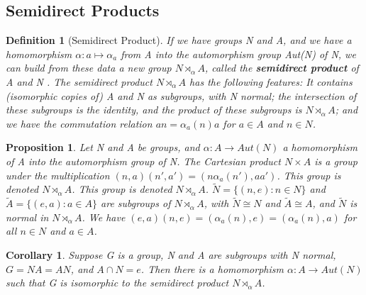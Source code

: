 \documentclass[12pt]{article}
\newtheorem{definition}{Definition}[subsection]
\newtheorem{proposition}{Proposition}[subsection]
\newtheorem{corollary}{Corollary}[subsection]
\begin{document}
    \subsection{Semidirect Products}
    \begin{definition}[Semidirect Product]
        If we have groups N and A, and we have a homomorphism $\alpha : a \mapsto \alpha_a$ from A into the automorphism group Aut(N) of N, we can build from these data a new group $N \rtimes_{\alpha} A$, called the \textbf{semidirect product} of A and N . The semidirect product $N \rtimes_{\alpha} A$ has the following features: It contains (isomorphic copies of) A and N as subgroups, with N normal; the intersection of these subgroups is the identity, and the product of these subgroups is $N \rtimes_{\alpha} A$; and we have the commutation relation $an = \alpha_a(n)a$ for $a \in A$ and $n \in N$.
    \end{definition}

    \begin{proposition}
        Let N and A be groups, and $\alpha: A \rightarrow Aut(N)$ a homomorphism of A into the automorphism group of N. The Cartesian product $N \times A$ is a group under the multiplication $(n, a)(n', a') = (n\alpha_a(n'), aa')$. This group is denoted $N \rtimes_{\alpha} A$. This group is denoted $N \rtimes_{\alpha} A$. $\tilde{N} = \{(n, e):n \in N\}$ and $\tilde{A} = \{(e, a): a \in A\}$ are subgroups of $N \rtimes_{\alpha} A$, with $\tilde{N} \cong N$ and $\tilde{A} \cong A$, and $\tilde{N}$ is normal in $N \rtimes_{\alpha} A$. We have $(e, a)(n, e) = (\alpha_a(n), e) = (\alpha_a(n), a)$ for all $n \in N$ and $a \in A$.
    \end{proposition}
    \begin{corollary}
        Suppose G is a group, N and A are subgroups with N normal, $G = NA = AN$, and $A\cap N = {e}$. Then there is a homomorphism $\alpha: A \rightarrow Aut(N)$ such that G is isomorphic to the semidirect product $N \rtimes_{\alpha} A$.
    \end{corollary}
\end{document}
